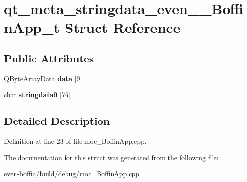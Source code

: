 \hypertarget{structqt__meta__stringdata__even_____boffin_app__t}{}\section{qt\+\_\+meta\+\_\+stringdata\+\_\+even\+\_\+\+\_\+\+Boffin\+App\+\_\+t Struct Reference}
\label{structqt__meta__stringdata__even_____boffin_app__t}
\subsection*{Public Attributes}
\begin{DoxyCompactItemize}
\item 
\mbox{\label{structqt__meta__stringdata__even_____boffin_app__t_adb6ea040d1966615c89ea7974cb24ed1}} 
Q\+Byte\+Array\+Data {\bfseries data} \mbox{[}9\mbox{]}
\item 
\mbox{\label{structqt__meta__stringdata__even_____boffin_app__t_a07c3aac8ac2fe45206763fc8247e1dd5}} 
char {\bfseries stringdata0} \mbox{[}76\mbox{]}
\end{DoxyCompactItemize}


\subsection{Detailed Description}


Definition at line 23 of file moc\+\_\+\+Boffin\+App.\+cpp.



The documentation for this struct was generated from the following file\+:\begin{DoxyCompactItemize}
\item 
even-\/boffin/build/debug/moc\+\_\+\+Boffin\+App.\+cpp\end{DoxyCompactItemize}
